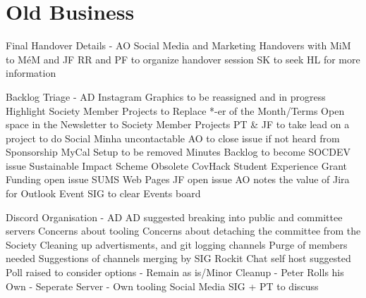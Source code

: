 \documentclass[11pt]{meetingmins}
\begin{document}
\section{Old Business}
\begin{items}
  \item 
  Final Handover Details - AO
    \subitem 
    Social Media and Marketing Handovers with MiM to M\'eM and JF
    \subitem
    RR and PF to organize handover session
    \subitem
    SK to seek HL for more information

  \item 
  Backlog Triage - AD
    \subitem
    Instagram Graphics to be reassigned and in progress
    \subitem
    Highlight Society Member Projects to Replace *-er of the Month/Terms
    \subitem
    Open space in the Newsletter to Society Member Projects
      \subsubitem 
      PT \& JF to take lead on a project to do Social
    \subitem 
    Minha uncontactable AO to close issue if not heard from Sponsorship
    \subitem
    MyCal Setup to be removed
    \subitem
    Minutes Backlog to become SOCDEV issue
    \subitem
    Sustainable Impact Scheme Obsolete
    \subitem
    CovHack Student Experience Grant Funding open issue
    \subitem
    SUMS Web Pages JF open issue
    \subitem
    AO notes the value of Jira for Outlook
    \subitem
    Event SIG to clear Events board
  \item
  Discord Organisation - AD
    \subitem
    AD suggested breaking into public and committee servers
      \subsubitem
      Concerns about tooling
      \subsubitem
      Concerns about detaching the committee from the Society
      \subsubitem
      Cleaning up advertisments, and git logging channels
    \subitem
    Purge of members needed
    \subitem
    Suggestions of channels merging by SIG
    \subitem
    Rockit Chat self host suggested
    \subitem
    Poll raised to consider options
       - Remain as is/Minor Cleanup
       - Peter Rolls his Own
       - Seperate Server
       - Own tooling
    \subitem
    Social Media SIG + PT to discuss
\end{items}
\end{document}
